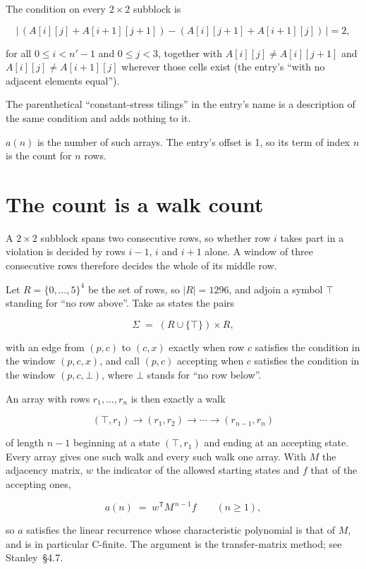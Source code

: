 \documentclass[11pt]{article}
\theoremstyle{definition}
\begin{document}
The condition on every $2 \times 2$ subblock is

\[\bigl|\,(A[i][j] + A[i{+}1][j{+}1]) - (A[i][j{+}1] + A[i{+}1][j])\,\bigr| = 2,\]

for all $0 \le i < n'-1$ and $0 \le j < 3$, together with $A[i][j] \ne A[i][j{+}1]$ and $A[i][j] \ne A[i{+}1][j]$ wherever those cells exist (the entry's ``with no adjacent elements equal'').

The parenthetical ``constant-stress tilings'' in the entry's name is a description of the same condition and adds nothing to it.

$a(n)$ is the number of such arrays. The entry's offset is 1, so its term of index $n$ is the count for $n$ rows.

\section{The count is a walk count}

A $2 \times 2$ subblock spans two consecutive rows, so whether row $i$ takes part in a violation is decided by rows $i-1$, $i$ and $i+1$ alone. A window of three consecutive rows therefore decides the whole of its middle row.

Let $R = \{0,\dots,5\}^{4}$ be the set of rows, so $|R| = 1296$, and adjoin a symbol $\top$ standing for ``no row above''. Take as states the pairs

\[\Sigma \;=\; (R \cup \{\top\}) \times R,\]

with an edge from $(p,c)$ to $(c,x)$ exactly when row $c$ satisfies the condition in the window $(p,c,x)$, and call $(p,c)$ accepting when $c$ satisfies the condition in the window $(p,c,\bot)$, where $\bot$ stands for ``no row below''.

An array with rows $r_1,\dots,r_n$ is then exactly a walk

\[(\top,r_1) \to (r_1,r_2) \to \cdots \to (r_{n-1},r_n)\]

of length $n-1$ beginning at a state $(\top,r_1)$ and ending at an accepting state. Every array gives one such walk and every such walk one array. With $M$ the adjacency matrix, $w$ the indicator of the allowed starting states and $f$ that of the accepting ones,

\[a(n) \;=\; w^{\mathsf T} M^{\,n-1} f \qquad (n \ge 1),\]

so $a$ satisfies the linear recurrence whose characteristic polynomial is that of $M$, and is in particular C-finite. The argument is the transfer-matrix method; see Stanley~\S4.7.
\end{document}

